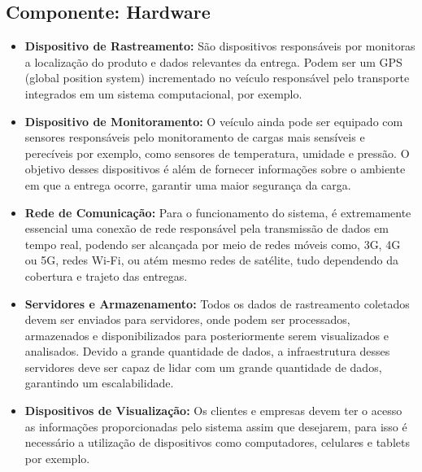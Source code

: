      \subsection{Componente: Hardware}
	  \begin{itemize}
	  	\item \textbf{Dispositivo de Rastreamento:} São dispositivos responsáveis por monitoras a localização do produto e dados relevantes da entrega. Podem ser um GPS (global position system) incrementado no veículo responsável pelo transporte integrados em um sistema computacional, por exemplo. 
	  	
	  	\item \textbf{Dispositivo de Monitoramento:} O veículo ainda pode ser equipado com sensores responsáveis pelo monitoramento de cargas mais sensíveis e perecíveis por exemplo, como sensores de temperatura, umidade e pressão. O objetivo desses dispositivos é além de fornecer informações sobre o ambiente em que a entrega ocorre, garantir uma maior segurança da carga.
	  	
	  	\item \textbf{Rede de Comunicação:} Para o funcionamento do sistema, é extremamente essencial uma conexão de rede responsável pela transmissão de dados em tempo real, podendo ser alcançada por meio de redes móveis como, 3G, 4G ou 5G, redes Wi-Fi, ou atém mesmo redes de satélite, tudo dependendo da cobertura e trajeto das entregas.
	  	
	  	\item \textbf{Servidores e Armazenamento:} Todos os dados de rastreamento coletados devem ser enviados para servidores, onde podem ser processados, armazenados e disponibilizados para posteriormente serem visualizados e analisados. Devido a grande quantidade de dados, a infraestrutura desses servidores deve ser capaz de lidar com um grande quantidade de dados, garantindo um escalabilidade.
	  	
	  	\item \textbf{Dispositivos de Visualização:} Os clientes e empresas devem ter o acesso as informações proporcionadas pelo sistema assim que desejarem, para isso é necessário a utilização de dispositivos como computadores, celulares e tablets por exemplo. 
	  \end{itemize}

